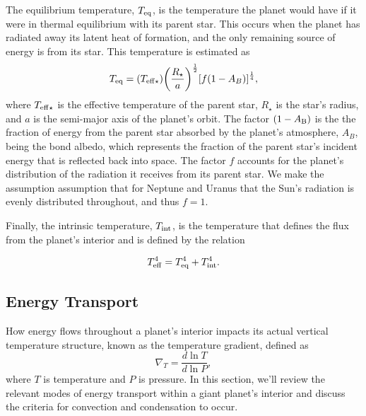 \documentclass[11pt]{ucscthesisbs}
\begin{document}
The equilibrium temperature, $T_{\rm eq}$, is the temperature the planet would have if it were in thermal equilibrium with its parent star. This occurs when the planet has radiated away its latent heat of formation, and the only remaining source of energy is from its star. This temperature is estimated as
\begin{equation}
    T_{\rm eq} = (T_{\rm eff\star})\bigg(\frac{R_{\star}}{a}\bigg)^{\frac{1}{2}}[f(1-A_{B})]^{\frac{1}{4}},
  \label{eq:equilibrium_temp}
\end{equation} 
where $T_{\rm eff\star}$ is the effective temperature of the parent star, $R_{\star}$ is the star's radius, and $a$ is the semi-major axis of the planet's orbit. The factor $(1 - A_{\rm B})$ is the the fraction of energy from the parent star absorbed by the planet's atmosphere, $A_{B}$, being the bond albedo, which represents the fraction of the parent star's incident energy that is reflected back into space. The factor $f$ accounts for the planet's distribution of the radiation it receives from its parent star. We make the assumption assumption that for Neptune and Uranus that the Sun's radiation is evenly distributed throughout, and thus $f = 1$. 

Finally, the intrinsic temperature, $T_{\rm int}$, is the temperature that defines the flux from the planet's interior and is defined by the relation

\begin{equation}
    T_{\rm eff}^4 =  T_{\rm eq}^4 +  T_{\rm int}^4.
  \label{eq:effective_temp}
\end{equation} 

\subsection{Energy Transport}
How energy flows throughout a planet's interior impacts its actual vertical temperature structure, known as the temperature gradient, defined as
\begin{equation}
  \nabla_{T} = \frac{d \ln T}{d\ln P} ,
\end{equation}
where $T$ is temperature and $P$ is pressure. In this section, we'll review the relevant modes of energy transport within a giant planet's interior and discuss the criteria for convection and condensation to occur.
\end{document}
